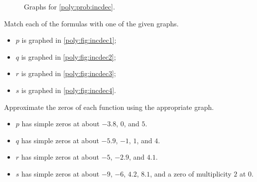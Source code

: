 \begin{exercises}
\begin{problem}
\begin{figure}[!htb]
\begin{widepage}
    \hfill
	\begin{subfigure}{\figurewidth}
        \caption{}
        \label{poly:fig:incdec4}
	\end{subfigure}
    \caption{Graphs for \cref{poly:prob:incdec}.}
    \label{poly:fig:incdec}
\end{widepage}
\end{figure}
\begin{subproblem}
Match each of the formulas with one of the given graphs.
    \begin{shortsolution}
     \begin{itemize}
      \item $p$ is graphed in \vref{poly:fig:incdec1};
      \item $q$ is graphed in \vref{poly:fig:incdec2};
      \item $r$ is graphed in \vref{poly:fig:incdec3};
      \item $s$ is graphed in \vref{poly:fig:incdec4}.
     \end{itemize}
    \end{shortsolution}
\end{subproblem}
\begin{subproblem}
Approximate the zeros of each function using the appropriate graph.
    \begin{shortsolution}
        \begin{itemize}
         \item $p$ has simple zeros at about $-3.8$, $0$, and $5$.
         \item $q$ has simple zeros at about $-5.9$, $-1$, $1$, and $4$.
         \item $r$ has simple zeros at about $-5$, $-2.9$, and $4.1$.
         \item $s$ has simple zeros at about $-9$, $-6$, $4.2$, $8.1$, and a zero of multiplicity $2$ at $0$.

\end{itemize}
\end{shortsolution}
\end{subproblem}
\end{problem}
\end{exercises}
